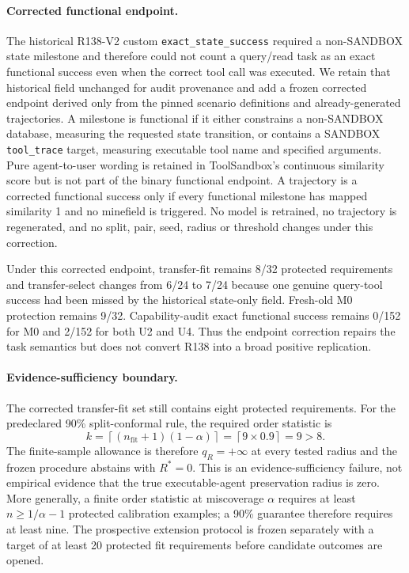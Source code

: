 \documentclass[11pt,letterpaper]{article}
\theoremstyle{plain}
\newcommand{\1}{\mathbf 1}
\begin{document}
\paragraph{Corrected functional endpoint.}
The historical R138-V2 custom \texttt{exact\_state\_success} required a non-SANDBOX state milestone and therefore could not count a query/read task as an exact functional success even when the correct tool call was executed. We retain that historical field unchanged for audit provenance and add a frozen corrected endpoint derived only from the pinned scenario definitions and already-generated trajectories. A milestone is functional if it either constrains a non-SANDBOX database, measuring the requested state transition, or contains a SANDBOX \texttt{tool\_trace} target, measuring executable tool name and specified arguments. Pure agent-to-user wording is retained in ToolSandbox's continuous similarity score but is not part of the binary functional endpoint. A trajectory is a corrected functional success only if every functional milestone has mapped similarity 1 and no minefield is triggered. No model is retrained, no trajectory is regenerated, and no split, pair, seed, radius or threshold changes under this correction.

Under this corrected endpoint, transfer-fit remains 8/32 protected requirements and transfer-select changes from 6/24 to 7/24 because one genuine query-tool success had been missed by the historical state-only field. Fresh-old M0 protection remains 9/32. Capability-audit exact functional success remains 0/152 for M0 and 2/152 for both U2 and U4. Thus the endpoint correction repairs the task semantics but does not convert R138 into a broad positive replication.

\paragraph{Evidence-sufficiency boundary.}
The corrected transfer-fit set still contains eight protected requirements. For the predeclared 90\% split-conformal rule, the required order statistic is
\begin{equation}
 k=\left\lceil (n_{\mathrm{fit}}+1)(1-\alpha)\right\rceil
   =\left\lceil 9\times0.9\right\rceil=9>8.
\label{eq:r138_evidence_boundary}
\end{equation}
The finite-sample allowance is therefore \(q_R=+\infty\) at every tested radius and the frozen procedure abstains with \(R^*=0\). This is an evidence-sufficiency failure, not empirical evidence that the true executable-agent preservation radius is zero. More generally, a finite order statistic at miscoverage \(\alpha\) requires at least \(n\ge 1/\alpha-1\) protected calibration examples; a 90\% guarantee therefore requires at least nine. The prospective extension protocol is frozen separately with a target of at least 20 protected fit requirements before candidate outcomes are opened.
\end{document}

